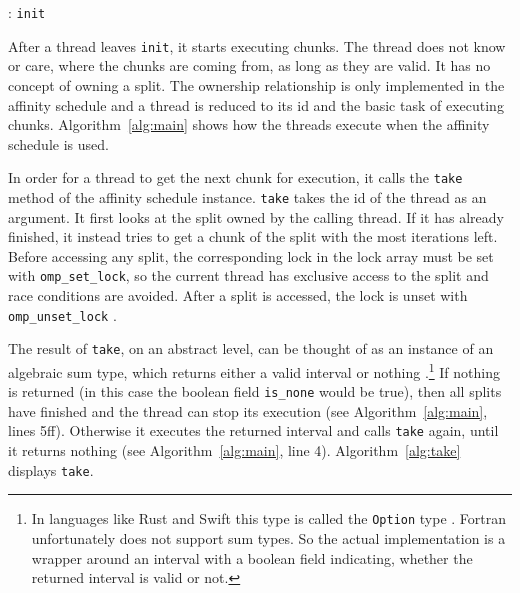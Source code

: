 \documentclass[twoside,11pt]{article}
\begin{document}
\begin{algorithm}
  \caption{: \texttt{init}}
  \label{alg:init}

  \begin{algorithmic}[1]
    \ENDIF
  \end{algorithmic}
\end{algorithm}

After a thread leaves \texttt{init}, it starts executing
chunks.
The thread does not know or care, where the chunks are
coming from, as long as they are valid.
It has no concept of owning a split.
The ownership relationship is only implemented in the
affinity schedule and a thread is reduced to its id and
the basic task of executing chunks.
Algorithm~\ref{alg:main} shows how the threads execute
when the affinity schedule is used.

In order for a thread to get the next chunk for execution,
it calls the \texttt{take} method of the affinity schedule
instance.
\texttt{take} takes the id of the thread as an argument.
It first looks at the split owned by the calling thread.
If it has already finished, it instead tries to get a
chunk of the split with the most iterations left.
Before accessing any split, the corresponding lock in the
lock array must be set with \texttt{omp\_set\_lock}, so
the current thread has exclusive access to the split and
race conditions are avoided.
After a split is accessed, the lock is unset with
\texttt{omp\_unset\_lock} \citep[see][Chapter 3]{omp}.

The result of \texttt{take}, on an abstract level, can be
thought of as an instance of an algebraic sum type, which
returns either a valid interval or nothing
\citep[for sum types see e.g.][]{sum_types}.\footnote{%
  In languages like Rust and Swift this type is called the
  \texttt{Option} type \citep[see][]{rust, swift}.
  Fortran unfortunately does not support sum types. So
  the actual implementation is a wrapper around an interval
  with a boolean field indicating, whether the returned
  interval is valid or not.}
If nothing is returned (in this case the boolean field
\texttt{is\_none} would be true), then all splits have
finished and the thread can stop its execution
(see Algorithm~\ref{alg:main}, lines 5ff).
Otherwise it executes the returned interval and calls
\texttt{take} again, until it returns nothing
(see Algorithm~\ref{alg:main}, line 4).
Algorithm~\ref{alg:take} displays \texttt{take}.
\end{document}
